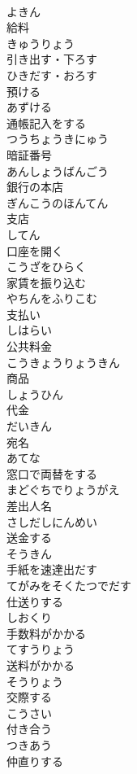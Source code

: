 \documentclass[8pt]{extreport}
\begin{document}
\begin{CJK}{UTF8}{min}
\\	よきん
\\	給料	
\\	きゅうりょう
\\	引き出す・下ろす	
\\	ひきだす・おろす
\\	預ける	
\\	あずける
\\	通帳記入をする	
\\	つうちょうきにゅう
\\	暗証番号	
\\	あんしょうばんごう
\\	銀行の本店	
\\	ぎんこうのほんてん
\\	支店	
\\	してん
\\	口座を開く	
\\	こうざをひらく
\\	家賃を振り込む	
\\	やちんをふりこむ
\\	支払い	
\\	しはらい
\\	公共料金	
\\	こうきょうりょうきん
\\	商品	
\\	しょうひん
\\	代金	
\\	だいきん
\\	宛名	
\\	あてな
\\	窓口で両替をする	
\\	まどぐちでりょうがえ
\\	差出人名	
\\	さしだしにんめい
\\	送金する	
\\	そうきん
\\	手紙を速達出だす	
\\	てがみをそくたつでだす
\\	仕送りする	
\\	しおくり
\\	手数料がかかる	
\\	てすうりょう
\\	送料がかかる	
\\	そうりょう
\\	交際する	
\\	こうさい
\\	付き合う	
\\	つきあう
\\	仲直りする	

\end{CJK}
\end{document}
